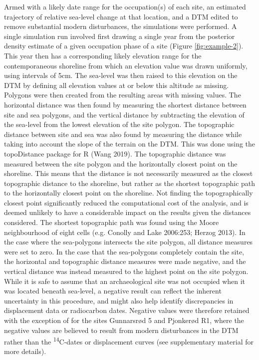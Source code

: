 \documentclass[
]{article}
\begin{document}
Armed with a likely date range for the occupation(s) of each site, an estimated trajectory of relative sea-level change at that location, and a DTM edited to remove substantial modern disturbances, the simulations were performed. A single simulation run involved first drawing a single year from the posterior density estimate of a given occupation phase of a site (Figure \ref{fig:example-2}). This year then has a corresponding likely elevation range for the contemporaneous shoreline from which an elevation value was drawn uniformly, using intervals of 5cm. The sea-level was then raised to this elevation on the DTM by defining all elevation values at or below this altitude as missing. Polygons were then created from the resulting areas with missing values. The horizontal distance was then found by measuring the shortest distance between site and sea polygons, and the vertical distance by subtracting the elevation of the sea-level from the lowest elevation of the site polygon. The topographic distance between site and sea was also found by measuring the distance while taking into account the slope of the terrain on the DTM. This was done using the topoDistance package for R (Wang 2019). The topographic distance was measured between the site polygon and the horizontally closest point on the shoreline. This means that the distance is not necessarily measured as the closest topographic distance to the shoreline, but rather as the shortest topographic path to the horizontally closest point on the shoreline. Not finding the topographically closest point significantly reduced the computational cost of the analysis, and is deemed unlikely to have a considerable impact on the results given the distances considered. The shortest topographic path was found using the Moore neighbourhood of eight cells (e.g. Conolly and Lake 2006:253; Herzog 2013). In the case where the sea-polygons intersects the site polygon, all distance measures were set to zero. In the case that the sea-polygons completely contain the site, the horizontal and topographic distance measures were made negative, and the vertical distance was instead measured to the highest point on the site polygon. While it is safe to assume that an archaeological site was not occupied when it was located beneath sea-level, a negative result can reflect the inherent uncertainty in this procedure, and might also help identify discrepancies in displacement data or radiocarbon dates. Negative values were therefore retained with the exception of for the sites Gunnarsrød 5 and Pjonkerød R1, where the negative values are believed to result from modern disturbances in the DTM rather than the \textsuperscript{14}C-dates or displacement curves (see supplementary material for more details).
\end{document}
